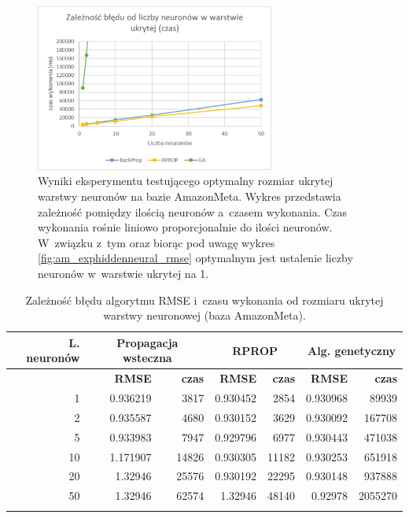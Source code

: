 \documentclass[twoside]{iisthesis}
\begin{document}
				\begin{figure}[H]
					\centering
					\includegraphics[width=0.7\textwidth]{am_exphiddenneural_time}
					\caption{Wyniki eksperymentu testującego optymalny rozmiar ukrytej warstwy neuronów na bazie AmazonMeta. Wykres przedstawia zależność pomiędzy ilością neuronów a~czasem wykonania. Czas wykonania rośnie liniowo proporcjonalnie do ilości neuronów. W~związku z~tym oraz biorąc pod uwagę wykres \ref{fig:am_exphiddenneural_rmse} optymalnym jest ustalenie liczby neuronów w~warstwie ukrytej na 1.}
					\label{fig:am_exphiddenneural_time}
				\end{figure}
	
				\begin{longtable}{r||rr|rr|rr}
					\label{tab:am_exphiddenneural}
					\centering
					\textbf{L. neuronów} &  \multicolumn{2}{c|}{\textbf{Propagacja wsteczna}}  & \multicolumn{2}{c|}{\textbf{RPROP}} & \multicolumn{2}{c}{\textbf{Alg. genetyczny}}  \\
					\hline
					& \textbf{RMSE} & \textbf{czas} & \textbf{RMSE} & \textbf{czas} & \textbf{RMSE} & \textbf{czas} \\
					\hline
					1  & 0.936219 & 3817  & 0.930452 & 2854  & 0.930968 & 89939   \\
					2  & 0.935587 & 4680  & 0.930152 & 3629  & 0.930092 & 167708  \\
					5  & 0.933983 & 7947  & 0.929796 & 6977  & 0.930443 & 471038  \\
					10 & 1.171907 & 14826 & 0.930305 & 11182 & 0.930253 & 651918  \\
					20 & 1.32946  & 25576 & 0.930192 & 22295 & 0.930148 & 937888  \\
					50 & 1.32946  & 62574 & 1.32946  & 48140 & 0.92978  & 2055270 \\	
					\caption{Zależność błędu algorytmu RMSE i~czasu wykonania od rozmiaru ukrytej warstwy neuronowej (baza AmazonMeta).}
				\end{longtable}
			
\end{document}
